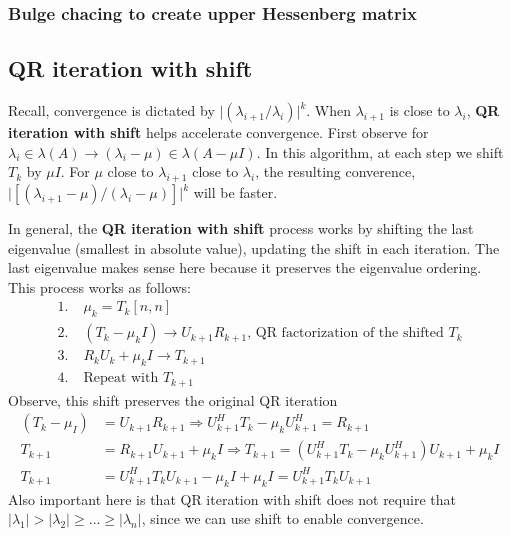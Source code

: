 \documentclass{article}
\newcommand{\abs}[1]{\lvert#1\rvert}
\begin{document}
\subsubsection{Bulge chacing to create upper Hessenberg matrix}


\subsection{QR iteration with shift}
Recall, convergence is dictated by $\abs{(\lambda_{i+1} / \lambda_i)}^k$. When $\lambda_{i+1}$ is close to $\lambda_i$, \textbf{QR iteration with shift} helps accelerate convergence. First observe for $\lambda_i \in \lambda(A) \rightarrow (\lambda_i - \mu) \in \lambda(A - \mu I)$. In this algorithm, at each step we shift $T_k$ by $\mu I$. For $\mu$ close to $\lambda_{i+1}$ close to $\lambda_i$, the resulting converence, $\abs{[(\lambda_{i+1} - \mu) / (\lambda_i - \mu)]}^k$ will be faster.

In general, the \textbf{QR iteration with shift} process works by shifting the last eigenvalue (smallest in absolute value), updating the shift in each iteration. The last eigenvalue makes sense here because it preserves the eigenvalue ordering. This process works as follows:
\begin{align*}
    1. \;& \mu_k = T_k[n, n]\\
    2. \;& (T_k - \mu_k I) \longrightarrow U_{k+1}R_{k+1} \textrm{, QR factorization of the shifted } T_k\\
    3. \;& R_kU_k + \mu_k I \longrightarrow T_{k+1}\\
    4. \;& \textrm{Repeat with } T_{k+1}
\end{align*}
Observe, this shift preserves the original QR iteration
\begin{align*}
    (T_k - \mu_ I) &= U_{k+1}R_{k+1} \Longrightarrow U_{k+1}^HT_k - \mu_k U_{k+1}^H = R_{k+1}\\
    T_{k+1} &= R_{k+1}U_{k+1} + \mu_k I \Longrightarrow T_{k+1} = (U_{k+1}^HT_k - \mu_k U_{k+1}^H)U_{k+1} + \mu_k I\\
    T_{k+1} &= U_{k+1}^HT_kU_{k+1} - \mu_k I + \mu_k I = U_{k+1}^HT_kU_{k+1}
\end{align*}
Also important here is that QR iteration with shift does not require that $\abs{\lambda_1} > \abs{\lambda_2} \geq \dots \geq \abs{\lambda_n}$, since we can use shift to enable convergence.
\end{document}
